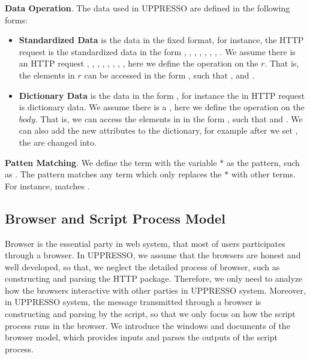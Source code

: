 \vspace{1mm}\noindent\textbf{Data Operation}.
The data used in UPPRESSO are defined in the following forms:
\begin{itemize}
\setlength\itemsep{-2pt}
\item \textbf{Standardized Data} is the data in the fixed format, for instance, the HTTP request is the standardized data in the form , , , , , , , .  We assume there is an HTTP request   ,  ,  ,  ,  ,  \myss{\myangle{}},  \myss{\myangle{}},  \myss{\myangle{}\rangle}, here we define the operation on the $r$. That is, the elements in $r$ can be accessed in the form , such that ,   and .
\item \textbf{Dictionary Data} is the data in the form , for instance the  in HTTP request is dictionary data. We assume there is a , here we define the operation on the $body$. That is, we can access the elements in  in the form , such that  and . We can also add the new attributes to the dictionary, for example after we set , the  are changed into.
\end{itemize}

\vspace{1mm}\noindent\textbf{Patten Matching}.  We define the term with the variable $*$ as the pattern, such as .
The pattern matches any term which only replaces the $*$ with other terms. For instance,   matches .


\subsection{Browser and Script Process Model}
Browser is the essential party in web system, that most of users participates through a browser.
In UPPRESSO, we assume that the browsers are honest and well developed, so that, we neglect  the detailed process of browser, such as constructing and parsing the HTTP package.
Therefore, we only need to analyze how the browsers interactive with other parties in UPPRESSO system.
Moreover, in UPPRESSO system, the message transmitted through a browser is constructing and parsing by the script, so that we only focus on how the script process runs in the browser.
We introduce the windows and documents of the browser model, which provides inputs and parses the outputs of the script process.

